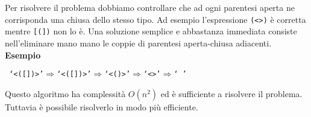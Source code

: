 
\newcommand{\tab}{\hspace{15px}}

Per risolvere il problema dobbiamo controllare che ad ogni parentesi aperta ne corrisponda una chiusa dello stesso tipo.\newline
Ad esempio l'espressione \texttt{(<>)} è corretta mentre \texttt{[(])} non lo è.
\SolNQ
Una soluzione semplice e abbastanza immediata consiste nell'eliminare mano mano le coppie di parentesi aperta-chiusa adiacenti.\newline
\textbf{Esempio}\newline

\texttt{
`<({}[])>'\tab$\Rightarrow$\tab`<([])>'\tab$\Rightarrow$\tab`<()>'\tab$\Rightarrow$\tab`<>'\tab$\Rightarrow$\tab `\ '}


Questo algoritmo ha complessità $O(n^2)$ ed è sufficiente a risolvere il problema.\newline
Tuttavia è possibile risolverlo in modo più efficiente.

